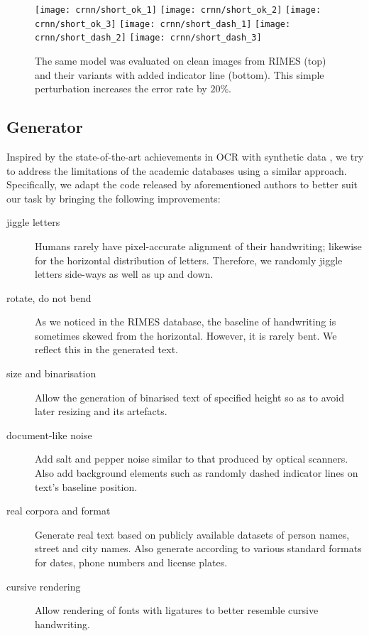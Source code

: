 			\begin{figure}
				\texttt{[image: crnn/short\_ok\_1]}
				\texttt{[image: crnn/short\_ok\_2]}
				\texttt{[image: crnn/short\_ok\_3]}
				\texttt{[image: crnn/short\_dash\_1]}
				\texttt{[image: crnn/short\_dash\_2]}
				\texttt{[image: crnn/short\_dash\_3]}
				\caption[Influence of backgrond elements]{The same model  was evaluated on clean images from RIMES (top) and their variants with added indicator line (bottom). This simple perturbation increases the error rate by \(20\%\). }
				\label{fig:crnn_dashes}
			\end{figure}


	\subsection{Generator}\label{sec:generator}

			Inspired by the state-of-the-art achievements in OCR with synthetic data \citep{synthetic_data}, we try to address the limitations of the academic databases using a similar approach. Specifically, we adapt the code released by aforementioned authors to better suit our task by bringing the following improvements:
			\begin{description}
				\item[jiggle letters] Humans rarely have pixel-accurate alignment of their handwriting; likewise for the horizontal distribution of letters. Therefore, we randomly jiggle letters side-ways as well as up and down.

				\item[rotate, do not bend] As we noticed in the RIMES database, the baseline of handwriting is sometimes skewed from the horizontal. However, it is rarely bent. We reflect this in the generated text.

				\item[size and binarisation] Allow the generation of binarised text of specified height so as to avoid later resizing and its artefacts.

				\item[document-like noise] Add salt and pepper noise similar to that produced by optical scanners. Also add background elements such as randomly dashed indicator lines on text's baseline position.

				\item[real corpora and format] Generate real text based on publicly available datasets of person names, street and city names. Also generate according to various standard formats for dates, phone numbers and license plates.

				\item[cursive rendering] Allow rendering of fonts with ligatures to better resemble cursive handwriting.
			\end{description}

